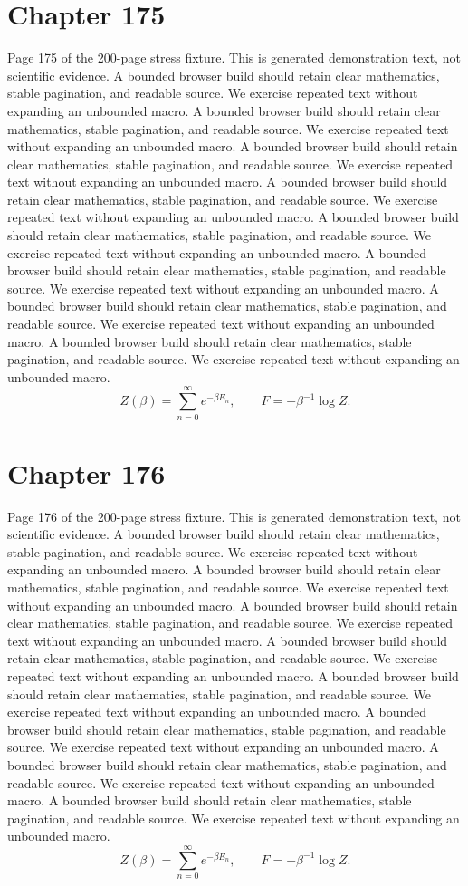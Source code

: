\documentclass[11pt]{article}
\begin{document}
\section*{Chapter 175}
Page 175 of the 200-page stress fixture. This is generated demonstration text, not scientific evidence.
A bounded browser build should retain clear mathematics, stable pagination, and readable source. We exercise repeated text without expanding an unbounded macro.
A bounded browser build should retain clear mathematics, stable pagination, and readable source. We exercise repeated text without expanding an unbounded macro.
A bounded browser build should retain clear mathematics, stable pagination, and readable source. We exercise repeated text without expanding an unbounded macro.
A bounded browser build should retain clear mathematics, stable pagination, and readable source. We exercise repeated text without expanding an unbounded macro.
A bounded browser build should retain clear mathematics, stable pagination, and readable source. We exercise repeated text without expanding an unbounded macro.
A bounded browser build should retain clear mathematics, stable pagination, and readable source. We exercise repeated text without expanding an unbounded macro.
A bounded browser build should retain clear mathematics, stable pagination, and readable source. We exercise repeated text without expanding an unbounded macro.
A bounded browser build should retain clear mathematics, stable pagination, and readable source. We exercise repeated text without expanding an unbounded macro.
\[Z(\beta)=\sum_{n=0}^{\infty}e^{-\beta E_n},\qquad F=-\beta^{-1}\log Z.\]
\newpage
\section*{Chapter 176}
Page 176 of the 200-page stress fixture. This is generated demonstration text, not scientific evidence.
A bounded browser build should retain clear mathematics, stable pagination, and readable source. We exercise repeated text without expanding an unbounded macro.
A bounded browser build should retain clear mathematics, stable pagination, and readable source. We exercise repeated text without expanding an unbounded macro.
A bounded browser build should retain clear mathematics, stable pagination, and readable source. We exercise repeated text without expanding an unbounded macro.
A bounded browser build should retain clear mathematics, stable pagination, and readable source. We exercise repeated text without expanding an unbounded macro.
A bounded browser build should retain clear mathematics, stable pagination, and readable source. We exercise repeated text without expanding an unbounded macro.
A bounded browser build should retain clear mathematics, stable pagination, and readable source. We exercise repeated text without expanding an unbounded macro.
A bounded browser build should retain clear mathematics, stable pagination, and readable source. We exercise repeated text without expanding an unbounded macro.
A bounded browser build should retain clear mathematics, stable pagination, and readable source. We exercise repeated text without expanding an unbounded macro.
\[Z(\beta)=\sum_{n=0}^{\infty}e^{-\beta E_n},\qquad F=-\beta^{-1}\log Z.\]
\newpage
\end{document}
